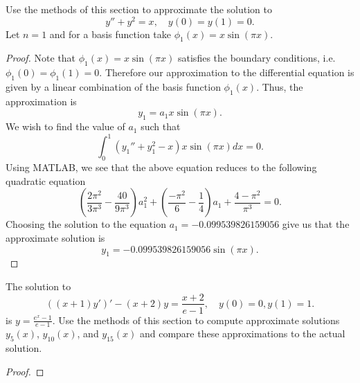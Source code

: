\documentclass[12pt]{article}
\theoremstyle{definition}
\newenvironment{custompbm}[1]
  {\renewcommand\theproblem{#1}\problem}
  {\endproblem}
\begin{document}
\begin{custompbm}{3}
  Use the methods of this section to approximate the solution to
  \[
    y'' + y^2 = x,\quad y(0) = y(1) = 0.
  \]
  Let $n=1$ and for a basis function take $\phi_1(x) = x\sin(\pi x)$.
\end{custompbm}

\begin{proof}
  Note that $\phi_1(x) = x\sin(\pi x)$ satisfies the boundary conditions, i.e.\
  $\phi_1(0) = \phi_1(1) = 0$. Therefore our approximation to the differential equation is
  given by a linear combination of the basis function $\phi_1(x)$. Thus, the approximation
  is
  \[
    y_1 = a_1 x\sin(\pi x).
  \]
  We wish to find the value of $a_1$ such that
  \[
    \int_0^1 \left(y_1'' + y_1^2 - x\right)x\sin(\pi x) dx = 0.
  \]
  Using MATLAB, we see that the above equation reduces to the following quadratic equation
  \[
    \left(\frac{2\pi^2}{3\pi^3} - \frac{40}{9\pi^3}\right)a_1^2 + \left(\frac{-\pi^2}{6} - \frac{1}{4}\right)a_1 + \frac{4 - \pi^2}{\pi^3} = 0.
  \]
  Choosing the solution to the equation $a_1 = -0.099539826159056$ give us that
  the approximate solution is
  \[
    y_1 = -0.099539826159056 \sin(\pi x).
  \]
\end{proof}


\begin{custompbm}{5}
  The solution to
  \[
    ((x+1)y')' - (x+2)y = \frac{x+2}{e-1},\quad y(0)= 0, y(1) = 1.
  \]
  is $y=\frac{e^x - 1}{e - 1}$. Use the methods of this section to compute
  approximate solutions $y_5(x)$, $y_{10}(x)$, and $y_{15}(x)$ and compare these
  approximations to the actual solution.
\end{custompbm}

\begin{proof}
\end{proof}
\end{document}
